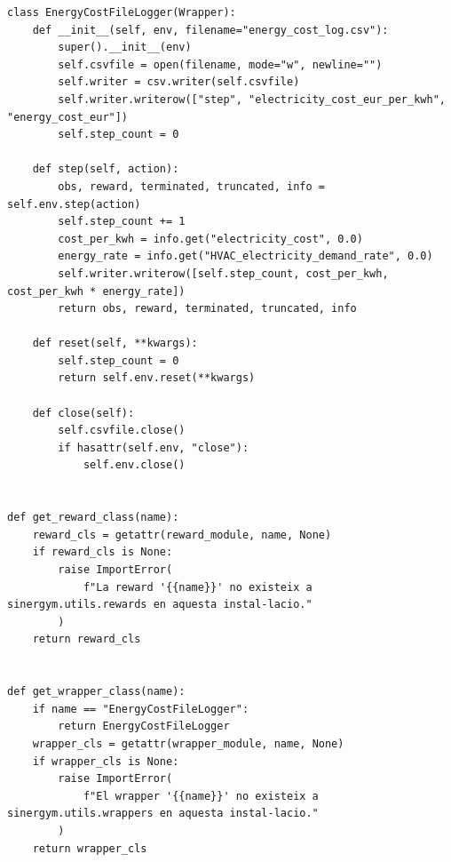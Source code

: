 \documentclass[10pt,a4paper]{article}
\begin{document}
\begin{lstlisting}[style=studioPython,caption={backend/training\_scripts.py},label={lst:backend-training-scripts-py}]
class EnergyCostFileLogger(Wrapper):
    def __init__(self, env, filename="energy_cost_log.csv"):
        super().__init__(env)
        self.csvfile = open(filename, mode="w", newline="")
        self.writer = csv.writer(self.csvfile)
        self.writer.writerow(["step", "electricity_cost_eur_per_kwh", "energy_cost_eur"])
        self.step_count = 0

    def step(self, action):
        obs, reward, terminated, truncated, info = self.env.step(action)
        self.step_count += 1
        cost_per_kwh = info.get("electricity_cost", 0.0)
        energy_rate = info.get("HVAC_electricity_demand_rate", 0.0)
        self.writer.writerow([self.step_count, cost_per_kwh, cost_per_kwh * energy_rate])
        return obs, reward, terminated, truncated, info

    def reset(self, **kwargs):
        self.step_count = 0
        return self.env.reset(**kwargs)

    def close(self):
        self.csvfile.close()
        if hasattr(self.env, "close"):
            self.env.close()


def get_reward_class(name):
    reward_cls = getattr(reward_module, name, None)
    if reward_cls is None:
        raise ImportError(
            f"La reward '{{name}}' no existeix a sinergym.utils.rewards en aquesta instal-lacio."
        )
    return reward_cls


def get_wrapper_class(name):
    if name == "EnergyCostFileLogger":
        return EnergyCostFileLogger
    wrapper_cls = getattr(wrapper_module, name, None)
    if wrapper_cls is None:
        raise ImportError(
            f"El wrapper '{{name}}' no existeix a sinergym.utils.wrappers en aquesta instal-lacio."
        )
    return wrapper_cls



\end{lstlisting}
\end{document}

